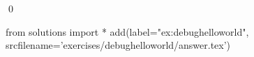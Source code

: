 
\begin{ex} 
  \label{ex:debughelloworld}
  
  \qed
\end{ex} 
\begin{python0}
from solutions import *
add(label="ex:debughelloworld",
    srcfilename='exercises/debughelloworld/answer.tex') 
\end{python0}
